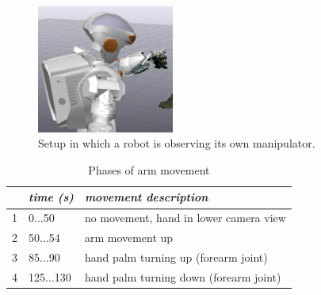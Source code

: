 
\begin{figure}
\captionsetup{width=0.4\textwidth}
\centering
\includegraphics[width=0.4\textwidth]{images/eval_vicon/sequence/setting.png}
\caption{Setup in which a robot is observing its own manipulator.}
\label{fig:vicon_free_movement}
\end{figure}

\begin{table}
\centering
\begin{tabular}{|c|l|l|}
\hline
 & \emph{time (s)} & \emph{movement description} \\
\hline
1 & 0$\dots$50 & no movement, hand in lower camera view \\
\hline
2 & 50$\dots$54 & arm movement up \\
\hline
3 & 85$\dots$90 & hand palm turning up (forearm joint) \\
\hline
4 & 125$\dots$130 & hand palm turning down (forearm joint) \\
\hline
\end{tabular}
\caption{Phases of arm movement}
\label{tab:vic_arm_movement_phases}
\end{table}

